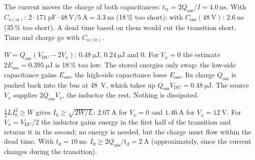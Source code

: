 \begin{solutionblock}
	The current moves the charge of both capacitances: $t_\mathrm{tr}=2Q_\mathrm{oss}/I=\SI{4.0}{\nano\second}$. With $C_\mathrm{o(er)}$: $2\cdot\SI{171}{\pico\farad}\cdot\SI{48}{\volt}/\SI{5}{\ampere}=\SI{3.3}{\nano\second}$ (18\,\% too short); with $C_\mathrm{oss}(\SI{48}{\volt})$: $\SI{2.6}{\nano\second}$ (35\,\% too short). A dead time based on them would cut the transition short. Time and charge go with $C_\mathrm{o(tr)}$.
\end{solutionblock}


\begin{solutionblock}
	$W=Q_\mathrm{oss}(V_\mathrm{DC}-2V_x)$: $\SI{0.48}{\micro\joule}$, $\SI{0.24}{\micro\joule}$ and 0. For $V_x=0$ the estimate $2E_\mathrm{oss}=\SI{0.395}{\micro\joule}$ is 18\,\% too low.
	The stored energies only swap: the low-side capacitance gains $E_\mathrm{oss}$, the high-side capacitance loses $E_\mathrm{oss}$. Its charge $Q_\mathrm{oss}$ is pushed back into the bus at \SI{48}{\volt}, which takes up $Q_\mathrm{oss}V_\mathrm{DC}=\SI{0.48}{\micro\joule}$. The source $V_x$ supplies $2Q_\mathrm{oss}V_x$, the inductor the rest. Nothing is dissipated.
\end{solutionblock}


\begin{solutionblock}
	$\frac{1}{2}LI_0^2\geq W$ gives $I_0\geq\sqrt{2W/L}$: $\SI{2.07}{\ampere}$ for $V_x=0$ and $\SI{1.46}{\ampere}$ for $V_x=\SI{12}{\volt}$. For $V_x=V_\mathrm{DC}/2$ the inductor gains energy in the first half of the transition and returns it in the second; no energy is needed, but the charge must flow within the dead time. With $t_\mathrm{d}=\SI{10}{\nano\second}$: $I_0\geq2Q_\mathrm{oss}/t_\mathrm{d}=\SI{2}{\ampere}$ (approximately, since the current changes during the transition).
\end{solutionblock}


